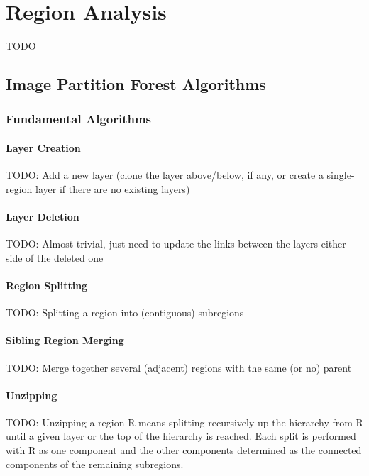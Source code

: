 \chapter{Region Analysis}
\label{chap:regionanalysis}

TODO

\section{Image Partition Forest Algorithms}

\subsection{Fundamental Algorithms}

\subsubsection{Layer Creation}

TODO: Add a new layer (clone the layer above/below, if any, or create a single-region layer if there are no existing layers)

\subsubsection{Layer Deletion}

TODO: Almost trivial, just need to update the links between the layers either side of the deleted one

\subsubsection{Region Splitting}

TODO: Splitting a region into (contiguous) subregions

\subsubsection{Sibling Region Merging}

TODO: Merge together several (adjacent) regions with the same (or no) parent

\subsubsection{Unzipping}

TODO: Unzipping a region R means splitting recursively up the hierarchy from R until a given layer or the top of the hierarchy is reached. Each split is performed with R as one component and the other components determined as the connected components of the remaining subregions.

